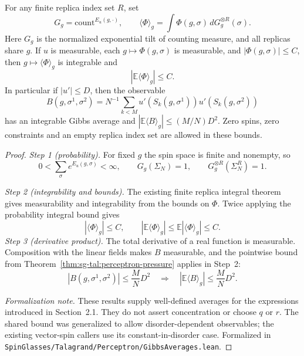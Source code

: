 \begin{theorem}\label{thm:sg-tal:perceptron-gibbs-averages}
  \leanok
For any finite replica index set $R$, set
\[
 G_g=\mathrm{count}^{E_u(g,\cdot)},\qquad
 \langle\Phi\rangle_g=\int\Phi(g,\sigma)\,dG_g^{\otimes R}(\sigma).
\]
Here $G_g$ is the normalized exponential tilt of counting measure, and all replicas share $g$.
If $u$ is measurable, each $g\mapsto\Phi(g,\sigma)$ is measurable, and $|\Phi(g,\sigma)|\le C$,
then $g\mapsto\langle\Phi\rangle_g$ is integrable and
\[
 |\mathbb E\langle\Phi\rangle_g|\le C.
\]
In particular if $|u'|\le D$, then the observable
\[
 B(g,\sigma^1,\sigma^2)=N^{-1}\sum_{k<M}u'(S_k(g,\sigma^1))u'(S_k(g,\sigma^2))
\]
has an integrable Gibbs average and $|\mathbb E\langle B\rangle_g|\le(M/N)D^2$.
Zero spins, zero constraints and an empty replica index set are allowed in these bounds.
\end{theorem}
\begin{proof}
  \leanok
\emph{Step 1 (probability).} For fixed $g$ the spin space is finite and nonempty, so
\[
 0<\sum_\sigma e^{E_u(g,\sigma)}<\infty,\qquad G_g(\Sigma_N)=1,\qquad
 G_g^{\otimes R}(\Sigma_N^R)=1.
\]

\emph{Step 2 (integrability and bounds).} The existing finite replica integral theorem gives
measurability and integrability from the bounds on $\Phi$. Twice applying the probability integral bound gives
\[
 |\langle\Phi\rangle_g|\le C,\qquad
 |\mathbb E\langle\Phi\rangle_g|\le\mathbb E|\langle\Phi\rangle_g|\le C.
\]
\emph{Step 3 (derivative product).} The total derivative of a real function is measurable.
Composition with the linear fields makes $B$ measurable, and the pointwise bound from
Theorem~\ref{thm:sg-tal:perceptron-pressure} applies in Step~2:
\[
 |B(g,\sigma^1,\sigma^2)|\le\frac MN D^2
 \quad\Longrightarrow\quad
 |\mathbb E\langle B\rangle_g|\le\frac MN D^2.
\]

\emph{Formalization note.} These results supply well-defined averages for the expressions introduced
in Section~2.1. They do not assert concentration or choose $q$ or $r$. The shared bound was generalized to
allow disorder-dependent observables; the existing vector-spin callers use its constant-in-disorder case.
Formalized in \texttt{SpinGlasses/Talagrand/Perceptron/GibbsAverages.lean}.
\end{proof}

